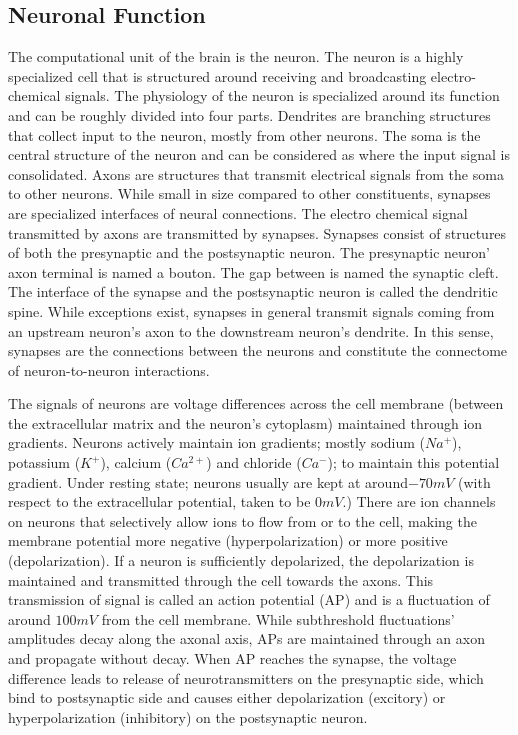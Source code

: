 \documentclass[../dissertation.tex]{subfiles}
\begin{document}
\subsection{Neuronal Function}

The computational unit of the brain is the neuron.
The neuron is a highly specialized cell that is structured around receiving and broadcasting electro-chemical signals.
The physiology of the neuron is specialized around its function and can be roughly divided into four parts.
Dendrites are branching structures that collect input to the neuron, mostly from other neurons.
The soma is the central structure of the neuron and can be considered as where the input signal is consolidated.
Axons are structures that transmit electrical signals from the soma to other neurons.
While small in size compared to other constituents, synapses are specialized interfaces of neural connections.
The electro chemical signal transmitted by axons are transmitted by synapses.
Synapses consist of structures of both the presynaptic and the postsynaptic neuron.
The presynaptic neuron' axon terminal is named a bouton.
The gap between is named the synaptic cleft.
The interface of the synapse and the postsynaptic neuron is called the dendritic spine.
While exceptions exist, synapses in general transmit signals coming from an upstream neuron's axon to the downstream neuron's dendrite.
In this sense, synapses are the connections between the neurons and constitute the connectome of neuron-to-neuron interactions.

The signals of neurons are voltage differences across the cell membrane (between the extracellular matrix and the neuron's cytoplasm) maintained through ion gradients.
Neurons actively maintain ion gradients; mostly sodium ($Na^{+}$), potassium ($K^{+}$), calcium ($Ca^{2+}$) and chloride ($Ca^{-}$); to maintain this potential gradient.
Under resting state; neurons usually are kept at around$-70 mV$ (with respect to the extracellular potential, taken to be $0 mV$.)
There are ion channels on neurons that selectively allow ions to flow from or to the cell, making the membrane potential more negative (hyperpolarization) or more positive (depolarization).
If a neuron is sufficiently depolarized, the depolarization is maintained and transmitted through the cell towards the axons.
This transmission of signal is called an action potential (AP) and is a fluctuation of around $100 mV$ from the cell membrane.
While subthreshold fluctuations' amplitudes decay along the axonal axis, APs are maintained through an axon and propagate without decay.
When AP reaches the synapse, the voltage difference leads to release of neurotransmitters on the presynaptic side, which bind to postsynaptic side and causes either depolarization (excitory) or hyperpolarization (inhibitory) on the postsynaptic neuron.
\end{document}
